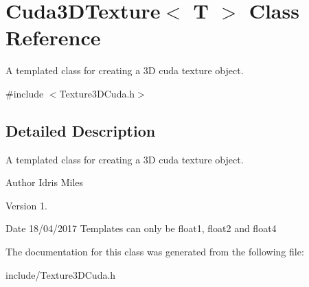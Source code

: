 \hypertarget{classCuda3DTexture_3_01T_01_4}{}\section{Cuda3\+D\+Texture$<$ T $>$ Class Reference}
\label{classCuda3DTexture_3_01T_01_4}


A templated class for creating a 3D cuda texture object.  




{\ttfamily \#include $<$Texture3\+D\+Cuda.\+h$>$}



\subsection{Detailed Description}
A templated class for creating a 3D cuda texture object. 

\begin{DoxyAuthor}{Author}
Idris Miles 
\end{DoxyAuthor}
\begin{DoxyVersion}{Version}
1. 
\end{DoxyVersion}
\begin{DoxyDate}{Date}
18/04/2017 Templates can only be float1, float2 and float4 
\end{DoxyDate}


The documentation for this class was generated from the following file\+:\begin{DoxyCompactItemize}
\item 
include/Texture3\+D\+Cuda.\+h\end{DoxyCompactItemize}

